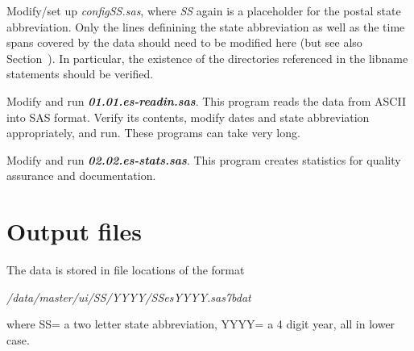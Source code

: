 \begin{steps}
\item Modify/set up \textit{configSS.sas}, where \textit{SS} again is a
  placeholder for the postal state abbreviation. Only the lines definining
  the state abbreviation as well as the time spans covered by the data
  should need to be modified here (but see also
  Section~). In particular, the existence of the
  directories referenced in the libname statements should be verified.

\item Modify and run \textbf{\textit{01.01.es-readin.sas}}. This program  reads the data from ASCII into SAS format.
Verify its contents, modify dates and state abbreviation appropriately, and
run. These programs can take very long.

\item Modify and run \textbf{\textit{02.02.es-stats.sas}}. This program
  creates statistics for quality assurance and documentation.
\end{steps}


\section{Output files}
The data is stored in file locations of the format 
\begin{center}
\textit{/data/master/ui/SS/YYYY/SSesYYYY.sas7bdat}
\end{center}
where SS= a two letter state abbreviation, YYYY= a 4 digit year, all in lower case.



